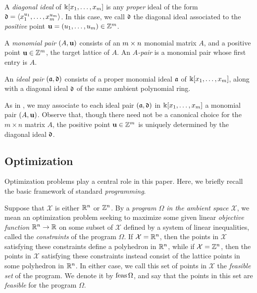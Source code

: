 \documentclass[11pt]{amsart}
\begin{document}
\begin{definition}  A  \emph{diagonal ideal} of $\Bbbk[x_1, \ldots, x_{m}]$ is any \emph{proper} ideal of the form $\mathfrak{d} = \langle x_1^{u_1}, \ldots, x_{m}^{u_{m}} \rangle$.  In this case,  we call $\mathfrak{d}$ the diagonal ideal associated to the \emph{positive} point $\mathbf{u} = (u_1, \ldots, u_{m}) \in \mathbb{Z}^{m}$.
\end{definition}

\begin{definition}[Pairs]  
\label{pairs: D}
   A \emph{monomial pair} $(A, \mathbf{u})$ consists of an $m \times n$ monomial matrix $A$, and a positive point $\mathbf{u} \in \mathbb{Z}^m$, the target lattice of $A$.  
    An \emph{$A$-pair} is a monomial pair whose first entry is $A$.
   
   An \emph{ideal pair} $(\mathfrak{a}, \mathfrak{d})$ consists of a proper monomial ideal $\mathfrak{a}$ of $\Bbbk[x_1, \ldots, x_{m}]$, along with a diagonal ideal $\mathfrak{d}$ of the same ambient polynomial ring.
\end{definition}

\begin{remark}
\label{associate of pairs: R}
 As in , we may associate to each ideal pair $(\mathfrak{a}, \mathfrak{d})$ in $\Bbbk[x_1, \ldots, x_{m}]$ a monomial pair $(A, \mathbf{u})$.  Observe that, though there need not be a canonical choice for the $m \times n$ matrix $A$, the positive point $\mathbf{u} \in \mathbb{Z}^m$ is uniquely determined by the diagonal ideal $\mathfrak{d}$.
\end{remark}

\subsection{Optimization} \label{optimization: S}  Optimization problems play a central role in this paper.  Here, we briefly recall the basic framework of standard \emph{programming}.

Suppose that $\mathcal{X}$ is either $\mathbb{R}^n$ or $\mathbb{Z}^n$.  By a \emph{program $\Omega$ in the ambient space $\mathcal{X}$}, we mean an optimization problem seeking to maximize some given linear \emph{objective function} $\mathbb{R}^n \to \mathbb{R}$ on some subset of $\mathcal{X}$ defined by a system of linear inequalities, called the \emph{constraints} of the program $\Omega$. If $\mathcal{X} = \mathbb{R}^n$, then the points in $\mathcal{X}$ satisfying these constraints define a polyhedron in $\mathbb{R}^n$, while if $\mathcal{X} = \mathbb{Z}^n$, then the points in $\mathcal{X}$ satisfying these constraints instead consist of the lattice points in some polyhedron in $\mathbb{R}^n$.  In either case, we call this set of points in $\mathcal{X}$ the \emph{feasible set} of the program.  We denote it by $\operatorname{feas} \Omega$, and say that the points in this set are \emph{feasible} for the program $\Omega$.
\end{document}
